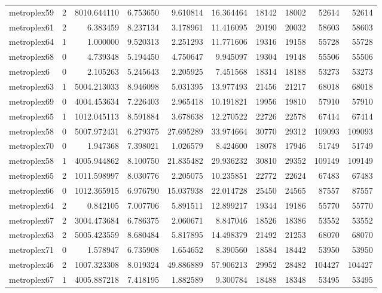 \begin{longtable}{|l|r|r|r|r|r|r|r|r|r|}
metroplex59 & 2 & 8010.644110 & 6.753650 & 9.610814 & 16.364464 & 18142 & 18002 & 52614 & 52614 \\
metroplex61 & 2 & 6.383459 & 8.237134 & 3.178961 & 11.416095 & 20190 & 20032 & 58603 & 58603 \\
metroplex64 & 1 & 1.000000 & 9.520313 & 2.251293 & 11.771606 & 19316 & 19158 & 55728 & 55728 \\
metroplex68 & 0 & 4.739348 & 5.194450 & 4.750647 & 9.945097 & 19304 & 19148 & 55506 & 55506 \\
metroplex6 & 0 & 2.105263 & 5.245643 & 2.205925 & 7.451568 & 18314 & 18188 & 53273 & 53273 \\
metroplex63 & 1 & 5004.213033 & 8.946098 & 5.031395 & 13.977493 & 21456 & 21217 & 68018 & 68018 \\
metroplex69 & 0 & 4004.453634 & 7.226403 & 2.965418 & 10.191821 & 19956 & 19810 & 57910 & 57910 \\
metroplex65 & 1 & 1012.045113 & 8.591884 & 3.678638 & 12.270522 & 22726 & 22578 & 67414 & 67414 \\
metroplex58 & 0 & 5007.972431 & 6.279375 & 27.695289 & 33.974664 & 30770 & 29312 & 109093 & 109093 \\
metroplex70 & 0 & 1.947368 & 7.398021 & 1.026579 & 8.424600 & 18078 & 17946 & 51749 & 51749 \\
metroplex58 & 1 & 4005.944862 & 8.100750 & 21.835482 & 29.936232 & 30810 & 29352 & 109149 & 109149 \\
metroplex65 & 2 & 1011.598997 & 8.030776 & 2.205075 & 10.235851 & 22772 & 22624 & 67483 & 67483 \\
metroplex66 & 0 & 1012.365915 & 6.976790 & 15.037938 & 22.014728 & 25450 & 24565 & 87557 & 87557 \\
metroplex64 & 2 & 0.842105 & 7.007706 & 5.891511 & 12.899217 & 19344 & 19186 & 55770 & 55770 \\
metroplex67 & 2 & 3004.473684 & 6.786375 & 2.060671 & 8.847046 & 18526 & 18386 & 53552 & 53552 \\
metroplex63 & 2 & 5005.423559 & 8.680484 & 5.817895 & 14.498379 & 21492 & 21253 & 68070 & 68070 \\
metroplex71 & 0 & 1.578947 & 6.735908 & 1.654652 & 8.390560 & 18584 & 18442 & 53950 & 53950 \\
metroplex46 & 2 & 1007.323308 & 8.019324 & 49.886889 & 57.906213 & 29952 & 28482 & 104427 & 104427 \\
metroplex67 & 1 & 4005.887218 & 7.418195 & 1.882589 & 9.300784 & 18488 & 18348 & 53495 & 53495 \\

\end{longtable}
